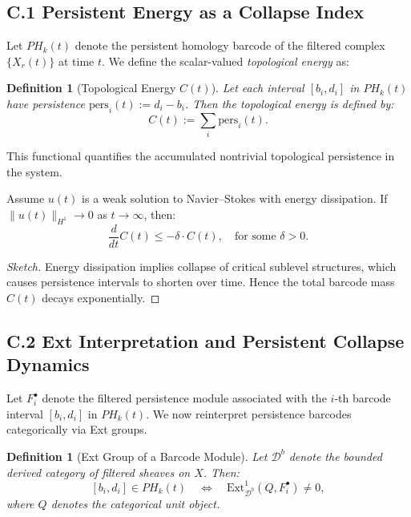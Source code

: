 \documentclass[11pt]{article}
\newtheorem{definition}[theorem]{Definition}
\begin{document}
\subsection*{C.1 Persistent Energy as a Collapse Index}

Let $PH_k(t)$ denote the persistent homology barcode of the filtered complex $\{X_r(t)\}$ at time $t$.  
We define the scalar-valued \emph{topological energy} as:

\begin{definition}[Topological Energy $C(t)$]
Let each interval $[b_i, d_i]$ in $PH_k(t)$ have persistence $\text{pers}_i(t) := d_i - b_i$.  
Then the topological energy is defined by:
\[
C(t) := \sum_i \text{pers}_i(t).
\]
\end{definition}

This functional quantifies the accumulated nontrivial topological persistence in the system.

\begin{lemma}
Assume $u(t)$ is a weak solution to Navier--Stokes with energy dissipation.  
If $\|u(t)\|_{H^1} \to 0$ as $t \to \infty$, then:
\[
\frac{d}{dt} C(t) \leq -\delta \cdot C(t), \quad \text{for some } \delta > 0.
\]
\end{lemma}

\begin{proof}[Sketch]
Energy dissipation implies collapse of critical sublevel structures, which causes persistence intervals to shorten over time.  
Hence the total barcode mass $C(t)$ decays exponentially.
\end{proof}

\subsection*{C.2 Ext Interpretation and Persistent Collapse Dynamics}

Let \( F^\bullet_i \) denote the filtered persistence module associated with the \( i \)-th barcode interval \( [b_i, d_i] \) in \( PH_k(t) \).  
We now reinterpret persistence barcodes categorically via Ext groups.

\begin{definition}[Ext Group of a Barcode Module]
Let \( \mathcal{D}^b \) denote the bounded derived category of filtered sheaves on \( X \).  
Then:
\[
[b_i, d_i] \in PH_k(t) 
\quad \Longleftrightarrow \quad 
\mathrm{Ext}^1_{\mathcal{D}^b}(Q, F^\bullet_i) \neq 0,
\]
where \( Q \) denotes the categorical unit object.
\end{definition}
\end{document}

